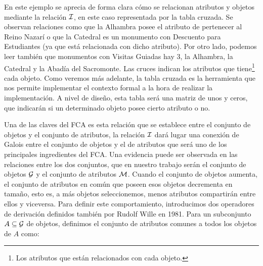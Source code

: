 \documentclass[oneside,openright,titlepage,numbers=noenddot,openany,headinclude,footinclude=true,
cleardoublepage=empty,abstractoff,BCOR=5mm,paper=a4,fontsize=12pt,main=spanish]{scrreprt}
\begin{document}
\begin{exampleth}\label{monuments}

\begin{table}[h]
    \centering
    \caption{Tabla cruzada de atributos por objetos, de un conjunto de datos de monumentos de Granada.}
    \label{tab:monumentos}
\end{table}
\end{exampleth}


En este ejemplo se aprecia de forma clara cómo se relacionan atributos y objetos mediante la relación $\mathcal{I}$, en este caso representada por la tabla cruzada. Se observan relaciones como que la Alhambra posee el atributo de pertenecer al Reino Nazarí o que la Catedral es un monumento con Descuento para Estudiantes (ya que está relacionada con dicho atributo). Por otro lado, podemos leer también que monumentos con Visitas Guiadas hay 3, la Alhambra, la Catedral y la Abadía del Sacromonte. Las cruces indican los atributos que tiene\footnote{Los atributos que están relacionados con cada objeto.} cada objeto. Como veremos más adelante, la tabla cruzada es la herramienta que nos permite implementar el contexto formal a la hora de realizar la implementación. A nivel de diseño, esta tabla será una matriz de unos y ceros, que indicarán si un determinado objeto posee cierto atributo o no.


Una de las claves del FCA es esta relación que se establece entre el conjunto de objetos y el conjunto de atributos, la relación $\mathcal{I}$ dará lugar una conexión de Galois entre el conjunto de objetos y el de atributos que será uno de los principales ingredientes del FCA. Una evidencia puede ser observada en las relaciones entre los dos conjuntos, que en nuestro trabajo serán el conjunto de objetos $\mathcal{G}$ y el conjunto de atributos $\mathcal{M}$. Cuando el conjunto de objetos aumenta, el conjunto de atributos en común que poseen esos objetos decrementa en tamaño, esto es, a más objetos seleccionemos, menos atributos compartirán entre ellos y viceversa. Para definir este comportamiento, introducimos dos operadores de derivación definidos también por Rudolf Wille en 1981. Para un subconjunto $A \subseteq \mathcal{G}$ de objetos, definimos el conjunto de atributos comunes a todos los objetos de $A$ como:
\end{document}
